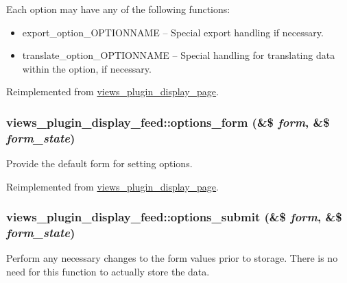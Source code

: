  Each option may have any of the following functions:\begin{itemize}
\item export\_\-option\_\-OPTIONNAME -- Special export handling if necessary.\item translate\_\-option\_\-OPTIONNAME -- Special handling for translating data within the option, if necessary. \end{itemize}


Reimplemented from \hyperlink{classviews__plugin__display__page_19b25a55cb43755a944d1f37c0180ff4}{views\_\-plugin\_\-display\_\-page}.\hypertarget{classviews__plugin__display__feed_be0a41d577b52de992279986d6c8c2d9}{
\subsubsection[{options\_\-form}]{\setlength{\rightskip}{0pt plus 5cm}views\_\-plugin\_\-display\_\-feed::options\_\-form (\&\$ {\em form}, \/  \&\$ {\em form\_\-state})}}
\label{classviews__plugin__display__feed_be0a41d577b52de992279986d6c8c2d9}


Provide the default form for setting options. 

Reimplemented from \hyperlink{classviews__plugin__display__page_a8267a4774b92a7b47a3768ac98aac36}{views\_\-plugin\_\-display\_\-page}.\hypertarget{classviews__plugin__display__feed_b7cca15934456ddb26045f03483899fb}{
\subsubsection[{options\_\-submit}]{\setlength{\rightskip}{0pt plus 5cm}views\_\-plugin\_\-display\_\-feed::options\_\-submit (\&\$ {\em form}, \/  \&\$ {\em form\_\-state})}}
\label{classviews__plugin__display__feed_b7cca15934456ddb26045f03483899fb}


Perform any necessary changes to the form values prior to storage. There is no need for this function to actually store the data. 

